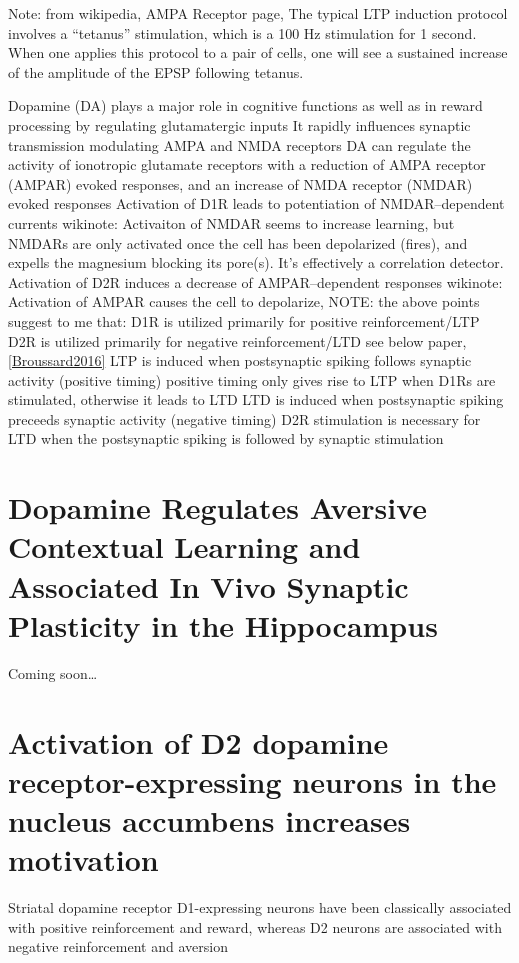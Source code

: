 \documentclass[11pt, a4paper, oneside]{article}   	%
\begin{document}
Note: from wikipedia, AMPA Receptor page, The typical LTP induction protocol involves a “tetanus” stimulation, which is a 100 Hz stimulation for 1 second. When one applies this protocol to a pair of cells, one will see a sustained increase of the amplitude of the EPSP following tetanus.
\begin{outline}
   \point Dopamine (DA) plays a major role in cognitive functions as well as in reward processing by regulating glutamatergic inputs
   \point It rapidly influences synaptic transmission modulating AMPA and NMDA receptors
   \point DA can regulate the activity of ionotropic glutamate receptors with a reduction of AMPA receptor (AMPAR) evoked responses, and an increase of NMDA receptor (NMDAR) evoked responses
    \subpoint Activation of D1R leads to potentiation of NMDAR--dependent currents
        \subsubpoint wikinote: Activaiton of NMDAR seems to increase learning, but NMDARs are only activated once the cell has been depolarized (fires), and expells the magnesium blocking its pore(s). It's effectively a correlation detector.
    \subpoint Activation of D2R induces a decrease of AMPAR--dependent responses
        \subsubpoint wikinote: Activation of AMPAR causes the cell to depolarize, 
    \subpoint NOTE: the above points suggest to me that:
        \subsubpoint D1R is utilized primarily for positive reinforcement/LTP
        \subsubpoint D2R is utilized primarily for negative reinforcement/LTD
        \subsubpoint see below paper, \ref{Broussard2016} 
    \point LTP is induced when postsynaptic spiking follows synaptic activity (positive timing)
        \subpoint positive timing only gives rise to LTP when D1Rs are stimulated, otherwise it leads to LTD
    \point LTD is induced when postsynaptic spiking preceeds synaptic activity (negative timing)
        \subpoint D2R stimulation is necessary for LTD when the postsynaptic spiking is followed by synaptic stimulation

\end{outline}

\section{Dopamine Regulates Aversive Contextual Learning and Associated In Vivo Synaptic Plasticity in the Hippocampus \cite{Broussard2016}}
 

Coming soon\ldots

\section{Activation of D2 dopamine receptor-expressing neurons in the nucleus accumbens increases motivation \cite{Soares-Cunha2016}}


\begin{outline}
    \point Striatal dopamine receptor D1-expressing neurons have been classically associated with positive reinforcement and reward, whereas D2 neurons are associated with negative reinforcement and aversion  

\end{outline}



\end{document}
